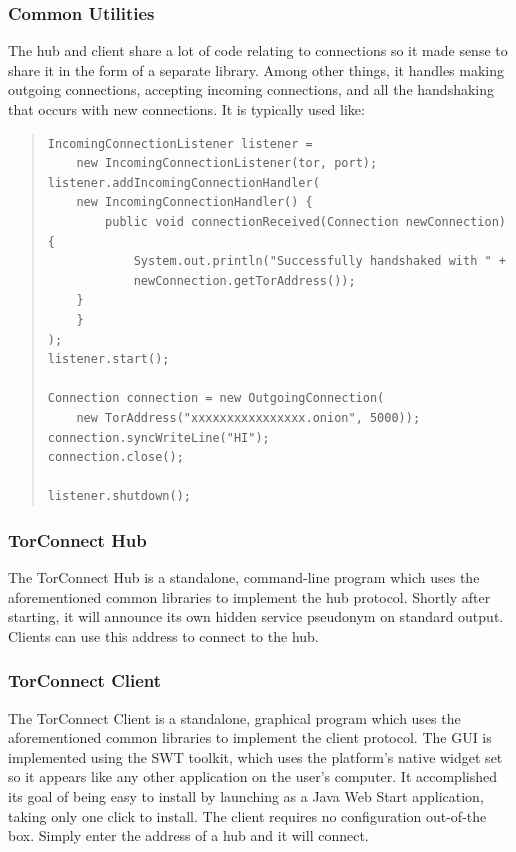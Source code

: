 \documentclass{article}
\begin{document}
\subsubsection{Common Utilities}
The hub and client share a lot of code relating to connections so it made sense to share it in the form of a separate library.  Among other things, it handles making outgoing connections, accepting incoming connections, and all the handshaking that occurs with new connections.  It is typically used like:
{ \scriptsize
\lstset{language=Java}
\begin{quote}
\begin{lstlisting}
IncomingConnectionListener listener =
	new IncomingConnectionListener(tor, port);
listener.addIncomingConnectionHandler(
    new IncomingConnectionHandler() {
        public void connectionReceived(Connection newConnection) {
            System.out.println("Successfully handshaked with " +
	        newConnection.getTorAddress());
	}
    }
);
listener.start();

Connection connection = new OutgoingConnection(
	new TorAddress("xxxxxxxxxxxxxxxx.onion", 5000));
connection.syncWriteLine("HI");
connection.close();

listener.shutdown();
\end{lstlisting}
\end{quote}
}

\subsubsection{TorConnect Hub}
The TorConnect Hub is a standalone, command-line program which uses the aforementioned common libraries to implement the hub protocol.  Shortly after starting, it will announce its own hidden service pseudonym on standard output.  Clients can use this address to connect to the hub.

\subsubsection{TorConnect Client}
The TorConnect Client is a standalone, graphical program which uses the aforementioned common libraries to implement the client protocol.  The GUI is implemented using the SWT toolkit, which uses the platform's native widget set so it appears like any other application on the user's computer.  It accomplished its goal of being easy to install by launching as a Java Web Start application, taking only one click to install.  The client requires no configuration out-of-the box.  Simply enter the address of a hub and it will connect.
\end{document}
